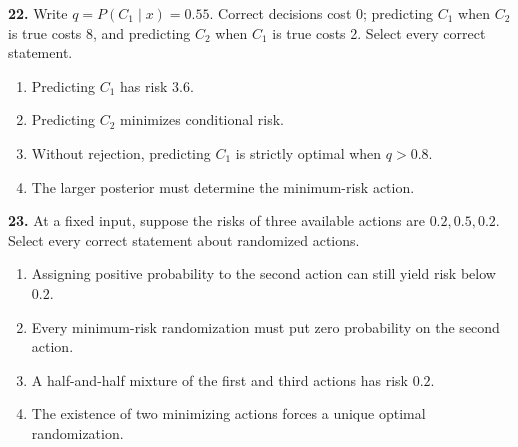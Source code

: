 \documentclass[11pt,a4paper]{article}
\begin{document}
\par\noindent\begin{minipage}{\linewidth}
\textbf{22.} Write \(q=P(C_1\mid x)=0.55\). Correct decisions cost 0; predicting \(C_1\) when \(C_2\) is true costs 8, and predicting \(C_2\) when \(C_1\) is true costs 2. Select every correct statement.
\begin{enumerate}[label=(\Alph*),leftmargin=8mm,itemsep=2pt,topsep=2pt]
\item Predicting \(C_1\) has risk \(3.6\).
\item Predicting \(C_2\) minimizes conditional risk.
\item Without rejection, predicting \(C_1\) is strictly optimal when \(q>0.8\).
\item The larger posterior must determine the minimum-risk action.
\end{enumerate}

\end{minipage}\par\vspace{3mm}
\par\noindent\begin{minipage}{\linewidth}
\textbf{23.} At a fixed input, suppose the risks of three available actions are \(0.2,0.5,0.2\). Select every correct statement about randomized actions.
\begin{enumerate}[label=(\Alph*),leftmargin=8mm,itemsep=2pt,topsep=2pt]
\item Assigning positive probability to the second action can still yield risk below \(0.2\).
\item Every minimum-risk randomization must put zero probability on the second action.
\item A half-and-half mixture of the first and third actions has risk \(0.2\).
\item The existence of two minimizing actions forces a unique optimal randomization.
\end{enumerate}

\end{minipage}\par\vspace{3mm}
\end{document}
